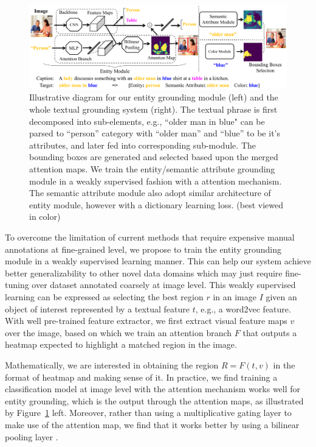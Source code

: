 \begin{figure}[t]
\begin{center}
\includegraphics[width=1.0\linewidth]{images/pipeline.pdf}
\end{center}
\caption[Illustrative diagram for our entity grounding module (left) and the whole
textual grounding system(right).]{Illustrative diagram for our entity grounding module (left) and the whole
textual grounding system (right). The textual phrase is first decomposed into sub-elements, e.g., ``older man in blue" can be parsed to ``person'' category with ``older man'' and ``blue'' to be it's attributes, and later fed into corresponding sub-module. The bounding boxes are generated and selected based upon the merged attention maps. We train the entity/semantic attribute grounding module in a weakly supervised fashion with a attention mechanism. The semantic attribute module also adopt similar architecture of entity module, however with a dictionary learning loss. (best viewed in color)}
\label{fig:pipeline}
\end{figure}


To overcome the limitation of current methods that require expensive manual annotations at fine-grained level,
we propose to train the entity grounding module in a weakly supervised learning manner.
This can help our system achieve better generalizability to other novel data domains which may just require fine-tuning over dataset annotated coarsely at image level.
This weakly supervised learning can be expressed as selecting the best region $r$ in an image $I$ given an object of interest represented by a textual feature $t$, e.g., a word2vec feature.
With well pre-trained feature extractor, we first extract visual feature maps $v$ over the image, 
based on which we train an attention branch $F$ that outputs
a heatmap expected to highlight a matched region in the image. 

Mathematically, we are interested in obtaining the region $R = F(t, v)$ in the format of heatmap and making sense of it. In practice, we find training a classification model at image level with the attention mechanism works well for entity grounding, which is the output through the attention maps, as illustrated by Figure~\ref{fig:pipeline} left. Moreover, rather than using a multiplicative gating layer to make use of the attention map, we find that it works better by using a bilinear pooling layer \citep{lin2015bilinear,gao2016compact,kong2017low}.

